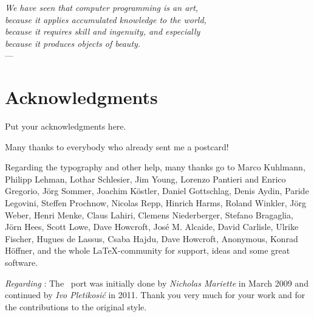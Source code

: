 
\begin{flushright}{\slshape
    We have seen that computer programming is an art, \\
    because it applies accumulated knowledge to the world, \\
    because it requires skill and ingenuity, and especially \\
    because it produces objects of beauty.} \\ \medskip
    ---  \citep{knuth:1974}
\end{flushright}



\bigskip

\begingroup
\let\clearpage\relax
\let\cleardoublepage\relax
\let\cleardoublepage\relax
\chapter*{Acknowledgments}
Put your acknowledgments here.

Many thanks to everybody who already sent me a postcard!

Regarding the typography and other help, many thanks go to Marco
Kuhlmann, Philipp Lehman, Lothar Schlesier, Jim Young, Lorenzo
Pantieri and Enrico Gregorio, J\"org Sommer,
Joachim K\"ostler, Daniel Gottschlag, Denis Aydin, Paride
Legovini, Steffen Prochnow, Nicolas Repp, Hinrich Harms,
Roland Winkler, Jörg Weber, Henri Menke, Claus Lahiri,
Clemens Niederberger, Stefano Bragaglia, Jörn Hees,
Scott Lowe, Dave Howcroft, Jos\'e M. Alcaide, David Carlisle,
Ulrike Fischer, Hugues de Lassus, Csaba Hajdu, Dave Howcroft,
Anonymous, Konrad Höffner, 
and the whole \LaTeX-community for support, ideas and
some great software.

\bigskip

\noindent\emph{Regarding \mLyX}: The \mLyX\ port was initially done by
\emph{Nicholas Mariette} in March 2009 and continued by
\emph{Ivo Pletikosi\'c} in 2011. Thank you very much for your
work and for the contributions to the original style.


\endgroup
